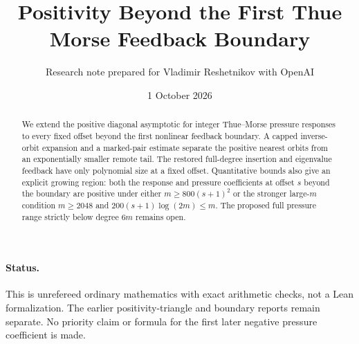 \documentclass[11pt,a4paper]{article}
\title{Positivity Beyond the First Thue Morse Feedback Boundary}
\author{Research note prepared for Vladimir Reshetnikov with OpenAI}\date{1 October 2026}
\theoremstyle{remark}\newtheorem*{ednote}{Editorial note (ProveIt, 2026-10-01)}
\begin{document}
\maketitle
\begin{abstract}
We extend the positive diagonal asymptotic for integer Thue--Morse pressure responses to every fixed offset beyond the first nonlinear feedback boundary. A capped inverse-orbit expansion and a marked-pair estimate separate the positive nearest orbits from an exponentially smaller remote tail. The restored full-degree insertion and eigenvalue feedback have only polynomial size at a fixed offset. Quantitative bounds also give an explicit growing region: both the response and pressure coefficients at offset $s$ beyond the boundary are positive under either $m\ge800(s+1)^2$ or the stronger large-$m$ condition $m\ge2048$ and $200(s+1)\log(2m)\le m$. The proposed full pressure range strictly below degree $6m$ remains open.
\end{abstract}
\paragraph{Status.} This is unrefereed ordinary mathematics with exact arithmetic checks, not a Lean formalization. The earlier positivity-triangle and boundary reports remain separate. No priority claim or formula for the first later negative pressure coefficient is made.
\end{document}
